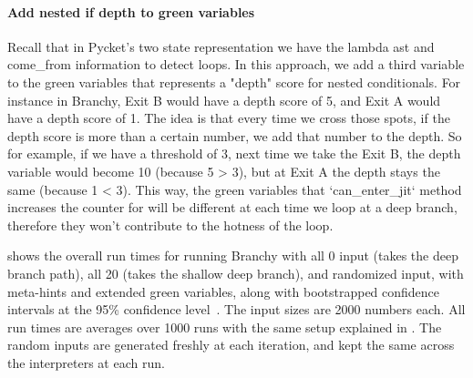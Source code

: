     \begin{paragraph-here}%
      \paragraph{Add nested if depth to green variables} Recall that in Pycket's two state representation we have the lambda ast and come\_from information to detect loops. In this approach, we add a third variable to the green variables that represents a "depth" score for nested conditionals. For instance in Branchy, Exit B would have a depth score of 5, and Exit A would have a depth score of 1. The idea is that every time we cross those spots, if the depth score is more than a certain number, we add that number to the depth. So for example, if we have a threshold of 3, next time we take the Exit B, the depth variable would become 10 (because 5 > 3), but at Exit A the depth stays the same (because 1 < 3). This way, the green variables that `can\_enter\_jit` method increases the counter for will be different at each time we loop at a deep branch, therefore they won't contribute to the hotness of the loop.
    \end{paragraph-here}


    \begin{paragraph-here}%
       shows the overall run times for running Branchy with all 0 input (takes the deep branch path), all 20 (takes the shallow deep branch), and randomized input, with meta-hints and extended green variables, along with bootstrapped confidence intervals at the 95\% confidence level~\cite{davisonBootstrapMethods2013}. The input sizes are 2000 numbers each. All run times are averages over 1000 runs with the same setup explained in . The random inputs are generated freshly at each iteration, and kept the same across the interpreters at each run.
    \end{paragraph-here}

